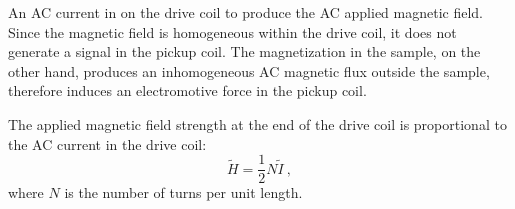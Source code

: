 An AC current in on the drive coil to produce the AC applied magnetic field. Since the magnetic field is homogeneous within the drive coil, it does not generate a signal in the pickup coil. The magnetization in the sample, on the other hand, produces an inhomogeneous AC magnetic flux outside the sample, therefore induces an electromotive force in the pickup coil.

The applied magnetic field strength at the end of the drive coil is proportional to the AC current in the drive coil:%
\begin{equation}%
    \widetilde{H} = \frac{1}{2}N\widetilde{I}~,
\end{equation}%
where $N$ is the number of turns per unit length.